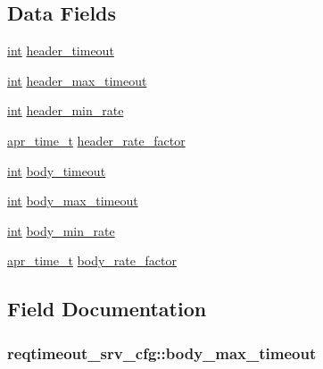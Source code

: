 \subsection*{Data Fields}
\begin{DoxyCompactItemize}
\item 
\hyperlink{pcre_8txt_a42dfa4ff673c82d8efe7144098fbc198}{int} \hyperlink{structreqtimeout__srv__cfg_af612d318e28c52682292f7cd3838e127}{header\+\_\+timeout}
\item 
\hyperlink{pcre_8txt_a42dfa4ff673c82d8efe7144098fbc198}{int} \hyperlink{structreqtimeout__srv__cfg_a5cd81dbdc7115c56c29074eabc672885}{header\+\_\+max\+\_\+timeout}
\item 
\hyperlink{pcre_8txt_a42dfa4ff673c82d8efe7144098fbc198}{int} \hyperlink{structreqtimeout__srv__cfg_a96c8fab20f32b4a5791cc89c9352606f}{header\+\_\+min\+\_\+rate}
\item 
\hyperlink{group__apr__time_gadb4bde16055748190eae190c55aa02bb}{apr\+\_\+time\+\_\+t} \hyperlink{structreqtimeout__srv__cfg_a104ad3dc90893ed3445267b4da4224d9}{header\+\_\+rate\+\_\+factor}
\item 
\hyperlink{pcre_8txt_a42dfa4ff673c82d8efe7144098fbc198}{int} \hyperlink{structreqtimeout__srv__cfg_a5f9814534f0e34c6f13ca5badc981ab9}{body\+\_\+timeout}
\item 
\hyperlink{pcre_8txt_a42dfa4ff673c82d8efe7144098fbc198}{int} \hyperlink{structreqtimeout__srv__cfg_a0d84e121d8141cc651a7ca811f2cb638}{body\+\_\+max\+\_\+timeout}
\item 
\hyperlink{pcre_8txt_a42dfa4ff673c82d8efe7144098fbc198}{int} \hyperlink{structreqtimeout__srv__cfg_a2ca75d912d33a322164bf241e986aa97}{body\+\_\+min\+\_\+rate}
\item 
\hyperlink{group__apr__time_gadb4bde16055748190eae190c55aa02bb}{apr\+\_\+time\+\_\+t} \hyperlink{structreqtimeout__srv__cfg_a746ba81b9abf1eaad19d7acb32d78f9b}{body\+\_\+rate\+\_\+factor}
\end{DoxyCompactItemize}


\subsection{Field Documentation}
\subsubsection[{\texorpdfstring{body\+\_\+max\+\_\+timeout}{body_max_timeout}}]{ reqtimeout\+\_\+srv\+\_\+cfg\+::body\+\_\+max\+\_\+timeout}\hypertarget{structreqtimeout__srv__cfg_a0d84e121d8141cc651a7ca811f2cb638}{}\label{structreqtimeout__srv__cfg_a0d84e121d8141cc651a7ca811f2cb638}
